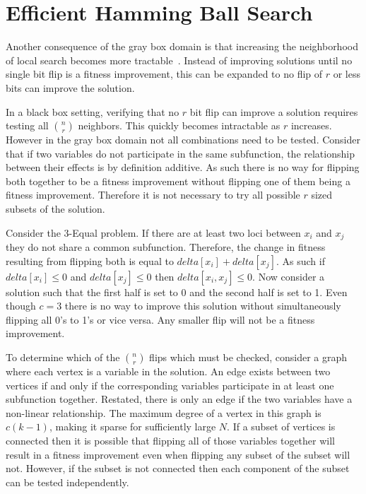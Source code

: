 \section{Efficient Hamming Ball Search}
Another consequence of the gray box domain is that increasing the neighborhood of local search becomes
more tractable~\cite{chicano:2014:ball}.  Instead of improving solutions until no single bit flip
is a fitness improvement, this can be expanded to no flip of $r$ or less bits can improve the solution.

In a black box setting, verifying that no $r$ bit flip can improve a solution requires testing all
$n \choose r$ neighbors. This quickly becomes intractable as $r$ increases. However in the gray
box domain not all combinations need to be tested. Consider that if two variables do not participate
in the same subfunction, the relationship between their effects is by definition additive. As such
there is no way for flipping both together to be a fitness improvement without flipping one of them
being a fitness improvement. Therefore it is not necessary to try all possible $r$ sized subsets
of the solution.

Consider the 3-Equal problem.  If there are at least two loci between $x_i$ and $x_j$ they do
not share a common subfunction. Therefore, the change in fitness resulting from flipping
both is equal to $delta[x_i] + delta[x_j]$. As such if $delta[x_i] \leq 0$ and $delta[x_j] \leq 0$
then $delta[x_i,x_j] \leq 0$. Now consider a solution such that the first half is set to 0
and the second half is set to 1. Even though $c=3$ there is no way to improve this solution without
simultaneously flipping all 0's to 1's or vice versa. Any smaller flip will not
be a fitness improvement.

To determine which of the $n \choose r$ flips which must be checked, consider a graph where
each vertex is a variable in the solution. An edge exists between two vertices if and only
if the corresponding variables participate in at least one subfunction together. Restated,
there is only an edge if the two variables have a non-linear relationship. The maximum
degree of a vertex in this graph is $c(k-1)$, making it sparse for sufficiently large $N$.
If a subset of vertices is connected then it is possible that flipping all of those
variables together will result in a fitness improvement even when flipping any subset
of the subset will not. However, if the subset is not connected then each component
of the subset can be tested independently.

